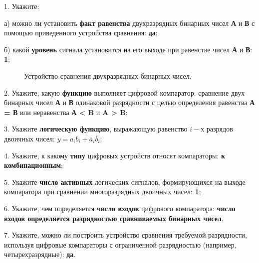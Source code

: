 \documentclass[bachelor, och, otchet, hidelinks]{SCWorks}
\begin{document}
\par 1. Укажите:

\par а) можно ли установить \textbf{факт равенства} двухразрядных бинарных чисел \textbf{А} и \textbf{В} с 
помощью приведенного устройства сравнения: \textbf{да}; 

\par б) какой \textbf{уровень} сигнала установится на его выходе при равенстве чисел \textbf{А} и \textbf{В}: 
\textbf{1};

\begin{figure}[h]
	\caption{Устройство сравнения двухразрядных бинарных чисел.}
\end{figure}

\par 2. Укажите, какую \textbf{функцию} выполняет цифровой компаратор: сравнение двух бинарных чисел \textbf{А} 
и \textbf{В} одинаковой разрядности с целью определения равенства \textbf{А = В} или неравенства \textbf{А < B} 
и \textbf{A > B};

\par 3. Укажите \textbf{логическую функцию}, выражающую равенство $i-$х разрядов двоичных чисел: 
$ y = a_ib_i + \overline{a}_i \overline{b}_i $;

\par 4. Укажите, к какому \textbf{типу} цифровых устройств относят компараторы: \textbf{к комбинационным};

\par 5. Укажите \textbf{число активных} логических сигналов, формирующихся на выходе компаратора при сравнении 
многоразрядных двоичных чисел: \textbf{1};

\par 6. Укажите, чем определяется \textbf{число входов} цифрового компаратора: \textbf{число входов определяется
разрядностью сравниваемых бинарных чисел}.

\par 7. Укажите, можно ли построить устройство сравнения требуемой разрядности, используя цифровые компараторы 
с ограниченной разрядностью (например, четырехразрядные): \textbf{да}.
\end{document}
